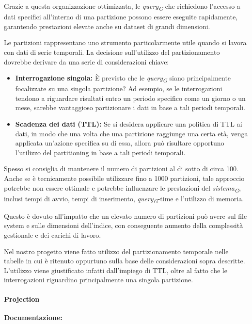 Grazie a questa organizzazione ottimizzata, le \textit{query}\textsubscript{\textit{G}} che richiedono l'accesso a dati specifici all'interno di una partizione possono essere eseguite rapidamente, garantendo prestazioni elevate anche su dataset di grandi dimensioni.

Le partizioni rappresentano uno strumento particolarmente utile quando si lavora con dati di serie temporali. La decisione sull'utilizzo del partizionamento dovrebbe derivare da una serie di considerazioni chiave:

\begin{itemize}
	\item \textbf{Interrogazione singola:} È previsto che le \textit{query}\textsubscript{\textit{G}} siano principalmente focalizzate su una singola partizione? Ad esempio, se le interrogazioni tendono a riguardare risultati entro un periodo specifico come un giorno o un mese, sarebbe vantaggioso partizionare i dati in base a tali periodi temporali.
	\item \textbf{Scadenza dei dati (TTL):} Se si desidera applicare una politica di TTL ai dati, in modo che una volta che una partizione raggiunge una certa età, venga applicata un'azione specifica su di essa, allora può risultare opportuno l'utilizzo del partitioning in base a tali periodi temporali.
\end{itemize}

Spesso si consiglia di mantenere il numero di partizioni al di sotto di circa 100. Anche se è tecnicamente possibile utilizzare fino a 1000 partizioni, tale approccio potrebbe non essere ottimale e potrebbe influenzare le prestazioni del \textit{sistema}\textsubscript{\textit{G}}, inclusi tempi di avvio, tempi di inserimento, \textit{query}\textsubscript{\textit{G}}-time e l'utilizzo di memoria.

Questo è dovuto all'impatto che un elevato numero di partizioni può avere sul file system e sulle dimensioni dell'indice, con conseguente aumento della complessità gestionale e dei carichi di lavoro.

Nel nostro progetto viene fatto utilizzo del partizionamento temporale nelle tabelle in cui è ritenuto oppurtuno sulla base delle considerazioni sopra descritte. L'utilizzo viene giustificato infatti dall'impiego di TTL, oltre al fatto che le interrogazioni riguardino principalmente una singola partizione.
    
\paragraph{Projection}\label{sec:projections}
\textbf{Documentazione:}

